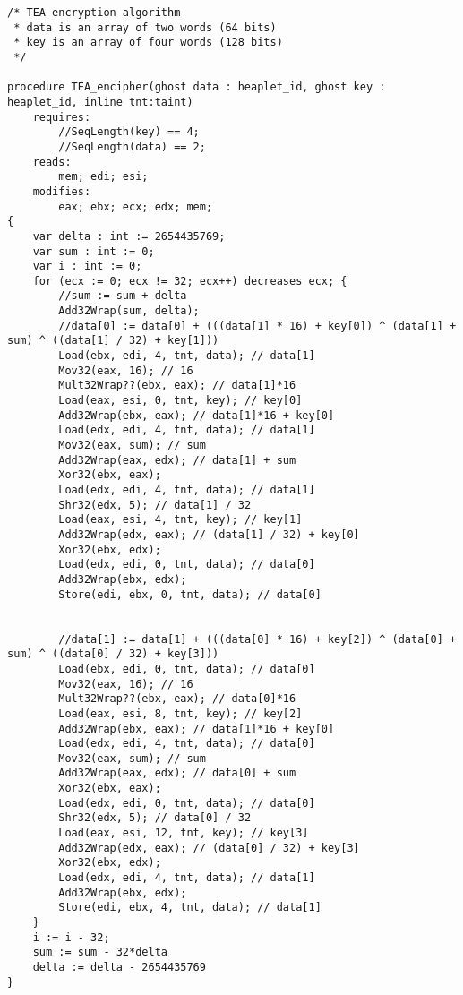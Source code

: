 \documentclass[a4paper,10pt,openright]{memoir}
\begin{document}
\begin{lstlisting}[language=Vale,breaklines=true]
/* TEA encryption algorithm
 * data is an array of two words (64 bits)
 * key is an array of four words (128 bits)
 */

procedure TEA_encipher(ghost data : heaplet_id, ghost key : heaplet_id, inline tnt:taint)
	requires:
		//SeqLength(key) == 4;
		//SeqLength(data) == 2;
	reads:
		mem; edi; esi;
	modifies:
		eax; ebx; ecx; edx; mem;
{
	var delta : int := 2654435769;
	var sum : int := 0;
	var i : int := 0;
	for (ecx := 0; ecx != 32; ecx++) decreases ecx; {
		//sum := sum + delta
		Add32Wrap(sum, delta);
		//data[0] := data[0] + (((data[1] * 16) + key[0]) ^ (data[1] + sum) ^ ((data[1] / 32) + key[1]))
		Load(ebx, edi, 4, tnt, data); // data[1]
		Mov32(eax, 16); // 16
		Mult32Wrap??(ebx, eax); // data[1]*16
		Load(eax, esi, 0, tnt, key); // key[0]
		Add32Wrap(ebx, eax); // data[1]*16 + key[0]
		Load(edx, edi, 4, tnt, data); // data[1]
		Mov32(eax, sum); // sum
		Add32Wrap(eax, edx); // data[1] + sum
		Xor32(ebx, eax);
		Load(edx, edi, 4, tnt, data); // data[1]
		Shr32(edx, 5); // data[1] / 32
		Load(eax, esi, 4, tnt, key); // key[1]
		Add32Wrap(edx, eax); // (data[1] / 32) + key[0]
		Xor32(ebx, edx);
		Load(edx, edi, 0, tnt, data); // data[0]
		Add32Wrap(ebx, edx);
		Store(edi, ebx, 0, tnt, data); // data[0]
		
		
		//data[1] := data[1] + (((data[0] * 16) + key[2]) ^ (data[0] + sum) ^ ((data[0] / 32) + key[3]))
		Load(ebx, edi, 0, tnt, data); // data[0]
		Mov32(eax, 16); // 16
		Mult32Wrap??(ebx, eax); // data[0]*16
		Load(eax, esi, 8, tnt, key); // key[2]
		Add32Wrap(ebx, eax); // data[1]*16 + key[0]
		Load(edx, edi, 4, tnt, data); // data[0]
		Mov32(eax, sum); // sum
		Add32Wrap(eax, edx); // data[0] + sum
		Xor32(ebx, eax);
		Load(edx, edi, 0, tnt, data); // data[0]
		Shr32(edx, 5); // data[0] / 32
		Load(eax, esi, 12, tnt, key); // key[3]
		Add32Wrap(edx, eax); // (data[0] / 32) + key[3]
		Xor32(ebx, edx);
		Load(edx, edi, 4, tnt, data); // data[1]
		Add32Wrap(ebx, edx);
		Store(edi, ebx, 4, tnt, data); // data[1]
	}
	i := i - 32;
	sum := sum - 32*delta
	delta := delta - 2654435769
}
\end{lstlisting}

\newpage ~
\thispagestyle{empty}
\end{document}
